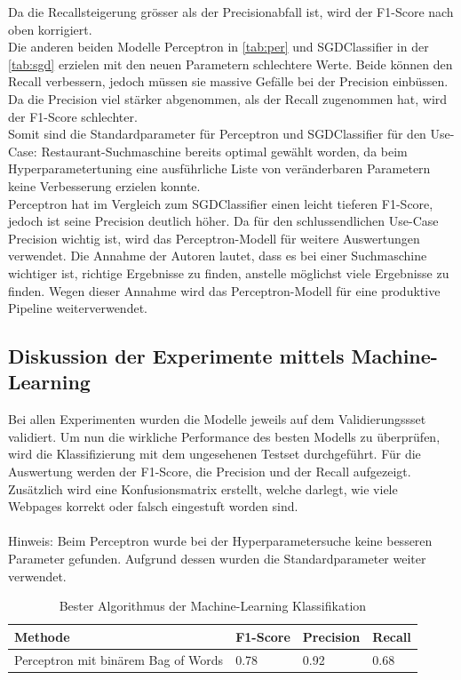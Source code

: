 Da die Recallsteigerung grösser als der Precisionabfall ist, wird der F1-Score nach oben korrigiert.\\
Die anderen beiden Modelle Perceptron in \cref{tab:per} und SGDClassifier in der \cref{tab:sgd} erzielen mit den neuen Parametern schlechtere Werte.
Beide können den Recall verbessern, jedoch müssen sie massive Gefälle bei der Precision einbüssen.
Da die Precision viel stärker abgenommen, als der Recall zugenommen hat, wird der F1-Score schlechter.\\
Somit sind die Standardparameter für Perceptron und SGDClassifier für den \glqq Use-Case: Restaurant-Suchmaschine\grqq{} bereits optimal gewählt worden, da beim Hyperparametertuning eine ausführliche Liste von veränderbaren Parametern keine Verbesserung erzielen konnte.\\
Perceptron hat im Vergleich zum SGDClassifier einen leicht tieferen F1-Score, jedoch ist seine Precision deutlich höher.
Da für den schlussendlichen \glqq Use-Case\grqq{} Precision wichtig ist, wird das Perceptron-Modell für weitere Auswertungen verwendet.
Die Annahme der Autoren lautet, dass es bei einer Suchmaschine wichtiger ist, richtige Ergebnisse zu finden, anstelle möglichst viele Ergebnisse zu finden.
Wegen dieser Annahme wird das Perceptron-Modell für eine produktive Pipeline weiterverwendet.
\subsection{Diskussion der Experimente mittels Machine-Learning}
Bei allen Experimenten wurden die Modelle jeweils auf dem Validierungssset validiert.
Um nun die wirkliche Performance des besten Modells zu überprüfen, wird die Klassifizierung mit dem ungesehenen Testset durchgeführt.
Für die Auswertung werden der F1-Score, die Precision und der Recall aufgezeigt.
Zusätzlich wird eine Konfusionsmatrix erstellt, welche darlegt, wie viele Webpages korrekt oder falsch eingestuft worden sind.
\\\\
Hinweis: Beim Perceptron wurde bei der Hyperparametersuche keine besseren Parameter gefunden.
Aufgrund dessen wurden die Standardparameter weiter verwendet.

\begin{table}[H]
	\caption{Bester Algorithmus der Machine-Learning Klassifikation}
	\centering
	\label{tab:bestclf}
	\begin{tabular}{|l|l|l|l|}
		\hline
		Methode & F1-Score & Precision & Recall\\
		\hline
		Perceptron mit binärem Bag of Words & 0.78 & 0.92 & 0.68 \\
		\hline
	\end{tabular}
\end{table}

